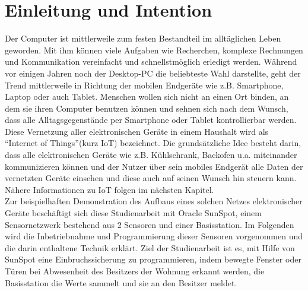 \chapter{Einleitung und Intention}\label{c:Einleitung} %

Der Computer ist mittlerweile zum festen Bestandteil im alltäglichen Leben geworden. Mit ihm können viele Aufgaben wie Recherchen, komplexe Rechnungen und Kommunikation vereinfacht und schnellstmöglich erledigt werden. Während vor einigen Jahren noch der Desktop-PC die beliebteste Wahl darstellte, geht der Trend mittlerweile in Richtung der mobilen Endgeräte wie z.B. Smartphone, Laptop oder auch Tablet. Menschen wollen sich nicht an einen Ort binden, an dem sie ihren Computer benutzen können und sehnen sich nach dem Wunsch, dass alle Alltagsgegenstände per Smartphone oder Tablet kontrollierbar werden.\\

Diese Vernetzung aller elektronischen Geräte in einem Haushalt wird als \textquotedblleft Internet of Things\textquotedblright (kurz IoT) bezeichnet. Die grundsätzliche Idee besteht darin, dass alle elektronischen Geräte wie z.B. Kühlschrank, Backofen u.a. miteinander kommunizieren können und der Nutzer über sein mobiles Endgerät alle Daten der vernetzten Geräte einsehen und diese auch auf seinen Wunsch hin steuern kann. Nähere Informationen zu IoT folgen im nächsten Kapitel.\\

Zur beispielhaften Demonstration des Aufbaus eines solchen Netzes elektronischer Geräte beschäftigt sich diese Studienarbeit mit Oracle SunSpot, einem Sensornetzwerk bestehend aus 2 Sensoren und einer Basisstation. Im Folgenden wird die Inbetriebnahme und Programmierung dieser Sensoren vorgenommen und die darin enthaltene Technik erklärt. Ziel der Studienarbeit ist es, mit Hilfe von SunSpot eine Einbruchssicherung zu programmieren, indem bewegte Fenster oder Türen bei Abwesenheit des Besitzers der Wohnung erkannt werden, die Basisstation die Werte sammelt und sie an den Besitzer meldet.

